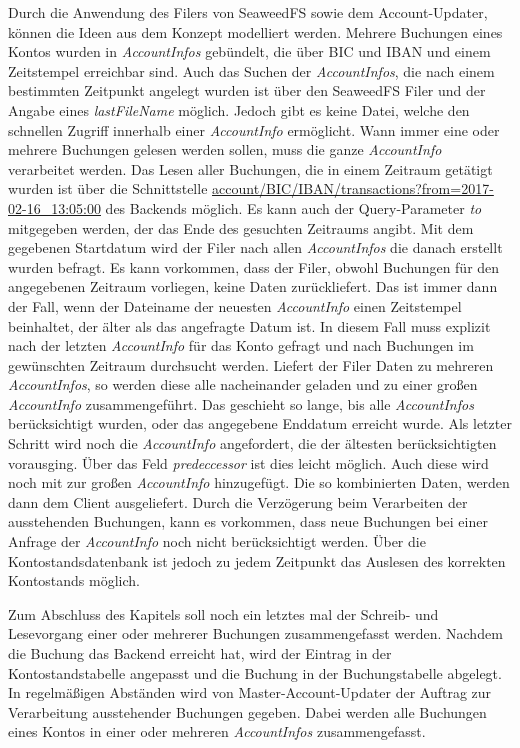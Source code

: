 \documentclass[12pt,oneside,a4paper,parskip]{scrbook}
\begin{document}
Durch die Anwendung des Filers von SeaweedFS sowie dem Account-Updater, können die Ideen aus dem Konzept modelliert werden.
Mehrere Buchungen eines Kontos wurden in \textit{AccountInfos} gebündelt, die über BIC und IBAN und einem Zeitstempel erreichbar sind. Auch das Suchen der \textit{AccountInfos}, die nach einem bestimmten Zeitpunkt angelegt wurden ist über den SeaweedFS Filer und der Angabe eines \textit{lastFileName} möglich. Jedoch gibt es keine Datei, welche den schnellen Zugriff innerhalb einer \textit{AccountInfo} ermöglicht. Wann immer eine oder mehrere Buchungen gelesen werden sollen, muss die ganze \textit{AccountInfo} verarbeitet werden. Das Lesen aller Buchungen, die in einem Zeitraum getätigt wurden ist über die Schnittstelle \url{account/BIC/IBAN/transactions?from=2017-02-16_13:05:00} des Backends möglich. Es kann auch der Query-Parameter \textit{to} mitgegeben werden, der das Ende des gesuchten Zeitraums angibt. Mit dem gegebenen Startdatum wird der Filer nach allen \textit{AccountInfos} die danach erstellt wurden befragt. Es kann vorkommen, dass der Filer, obwohl Buchungen für den angegebenen Zeitraum vorliegen, keine Daten zurückliefert. Das ist immer dann der Fall, wenn der Dateiname der neuesten \textit{AccountInfo} einen Zeitstempel beinhaltet, der älter als das angefragte Datum ist. In diesem Fall muss explizit nach der letzten \textit{AccountInfo} für das Konto gefragt und nach Buchungen im gewünschten Zeitraum durchsucht werden. Liefert der Filer Daten zu mehreren \textit{AccountInfos}, so werden diese alle nacheinander geladen und zu einer großen \textit{AccountInfo} zusammengeführt. Das geschieht so lange, bis alle \textit{AccountInfos} berücksichtigt wurden, oder das angegebene Enddatum erreicht wurde. Als letzter Schritt wird noch die \textit{AccountInfo} angefordert, die der ältesten berücksichtigten vorausging. Über das Feld \textit{predeccessor} ist dies leicht möglich. Auch diese wird noch mit zur großen \textit{AccountInfo} hinzugefügt. Die so kombinierten Daten, werden dann dem Client ausgeliefert. 
Durch die Verzögerung beim Verarbeiten der ausstehenden Buchungen, kann es vorkommen, dass neue Buchungen bei einer Anfrage der \textit{AccountInfo} noch nicht berücksichtigt werden. Über die Kontostandsdatenbank ist jedoch zu jedem Zeitpunkt das Auslesen des korrekten Kontostands möglich.

Zum Abschluss des Kapitels soll noch ein letztes mal der Schreib- und Lesevorgang einer oder mehrerer Buchungen zusammengefasst werden. Nachdem die Buchung das Backend erreicht hat, wird der Eintrag in der Kontostandstabelle angepasst und die Buchung in der Buchungstabelle abgelegt. In regelmäßigen Abständen wird von Master-Account-Updater der Auftrag zur Verarbeitung ausstehender Buchungen gegeben. Dabei werden alle Buchungen eines Kontos in einer oder mehreren \textit{AccountInfos} zusammengefasst.
\end{document}

